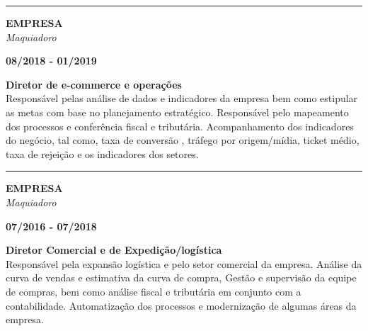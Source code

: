 \documentclass[12pt, a4paper]{article}
\newcommand{\LlinhaM}{1pt} 	 %
\newcommand{\TlinhaM}{17cm}		 %
\begin{document}
\begin{center} %
	\rule{\TlinhaM}{\LlinhaM}
\end{center}

\begin{multicols}{2}
	\begin{flushleft}
		\textbf{EMPRESA}\\
		\textit{Maquiadoro}\\
	\end{flushleft}
	\vfill
	\begin{flushright}
		\textbf{08/2018 - 01/2019}\\
	\end{flushright}
\end{multicols}
\begin{flushleft}
	\textbf{Diretor de e-commerce e operações}\\
	Responsável pelas análise de dados e indicadores da empresa bem como estipular as metas com base no planejamento estratégico.
	Responsável pelo mapeamento dos processos e conferência fiscal e tributária. Acompanhamento dos indicadores do negócio, tal como,
	taxa de conversão , tráfego por origem/mídia, ticket médio, taxa de rejeição e os indicadores dos setores.
\end{flushleft}

\begin{center} %
	\rule{\TlinhaM}{\LlinhaM}
\end{center}

\begin{multicols}{2}
	\begin{flushleft}
		\textbf{EMPRESA}\\
		\textit{Maquiadoro}\\
	\end{flushleft}
	\vfill
	\begin{flushright}
		\textbf{07/2016 - 07/2018}\\
	\end{flushright}
\end{multicols}
\begin{flushleft}
	\textbf{Diretor Comercial e de Expedição/logística}\\
	Responsável pela expansão logística e pelo setor comercial da empresa. Análise da curva de vendas e estimativa da curva de compra,
	Gestão e supervisão da equipe de compras, bem como análise fiscal e tributária em conjunto com a contabilidade.
	Automatização dos processos e modernização de algumas áreas da empresa.
\end{flushleft}
\end{document}
